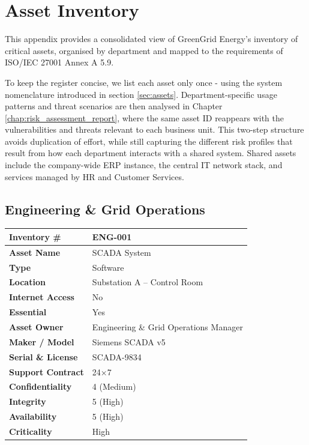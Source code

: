\chapter{Asset Inventory}
\label{appendix:asset_inventory}

This appendix provides a consolidated view of GreenGrid Energy's inventory of critical assets, organised by department and mapped to the requirements of ISO/IEC 27001 Annex A 5.9.

To keep the register concise, we list each asset only once - using the system nomenclature introduced in section \ref{sec:assets}.
Department-specific usage patterns and threat scenarios are then analysed in Chapter \ref{chap:risk_assessment_report}, where the same
asset ID reappears with the vulnerabilities and threats relevant to each business unit. This two-step structure avoids duplication
of effort, while still capturing the different risk profiles that result from how each department interacts with a shared system.
Shared assets include the company-wide \ac{ERP} instance, the central \ac{IT} network stack, and services managed by \ac{HR} and Customer Services.


\section*{Engineering \& Grid Operations}

\begin{longtable}{|p{4cm}|p{9cm}|}
\hline
\textbf{Inventory \#} & ENG-001 \\\hline
\textbf{Asset Name} & \ac{SCADA} System \\\hline
\textbf{Type} & Software \\\hline
\textbf{Location} & Substation A – Control Room \\\hline
\textbf{Internet Access} & No \\\hline
\textbf{Essential} & Yes \\\hline
\textbf{Asset Owner} & Engineering \& Grid Operations Manager \\\hline
\textbf{Maker / Model} & Siemens \ac{SCADA} v5 \\\hline
\textbf{Serial \& License} & \ac{SCADA}-9834 \\\hline
\textbf{Support Contract} & 24×7 \\\hline
\textbf{Confidentiality} & 4 (Medium) \\\hline
\textbf{Integrity} & 5 (High) \\\hline
\textbf{Availability} & 5 (High) \\\hline
\textbf{Criticality} & High \\\hline
\end{longtable}

